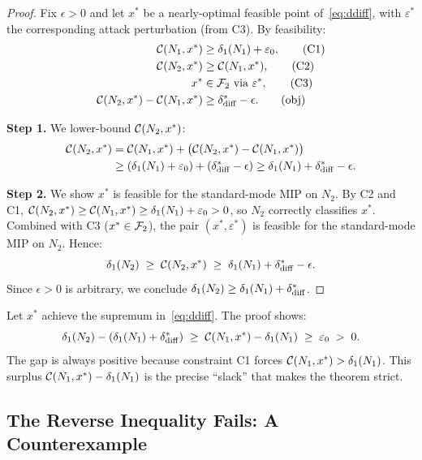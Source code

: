 \begin{proof}
  Fix $\epsilon>0$ and let $x^*$ be a nearly-optimal feasible point of~\eqref{eq:ddiff}, with $\varepsilon^*$ the corresponding attack perturbation (from C3). By feasibility:
  \begin{align}
    \mathcal{C}(N_1,x^*) &\geq \delta_1(N_{1})+\varepsilon_0, \tag{C1}\\
    \mathcal{C}(N_2,x^*) &\geq \mathcal{C}(N_1,x^*), \tag{C2}\\
    x^* &\in\mathcal{F}_{2} \text{ via } \varepsilon^*, \tag{C3}\\
    \mathcal{C}(N_2,x^*)-\mathcal{C}(N_1,x^*) &\geq \delta_{\mathrm{diff}}^{*}-\epsilon. \tag{obj}
  \end{align}

  \textbf{Step 1.} We lower-bound $\mathcal{C}(N_2,x^*)$:
  \begin{align*}
    \mathcal{C}(N_2,x^*)
    &= \mathcal{C}(N_1,x^*)+\bigl(\mathcal{C}(N_2,x^*)-\mathcal{C}(N_1,x^*)\bigr)\\
    &\geq (\delta_1(N_{1})+\varepsilon_0)+(\delta_{\mathrm{diff}}^{*}-\epsilon)
    \geq \delta_1(N_{1})+\delta_{\mathrm{diff}}^{*}-\epsilon.
  \end{align*}

  \textbf{Step 2.} We show $x^*$ is feasible for the standard-mode MIP on $N_2$. By C2 and C1, $\mathcal{C}(N_2,x^*)\geq\mathcal{C}(N_1,x^*)\geq\delta_1(N_{1})+\varepsilon_0>0$, so $N_2$ correctly classifies $x^*$. Combined with C3 ($x^*\in\mathcal{F}_{2}$), the pair $(x^*,\varepsilon^*)$ is feasible for the standard-mode MIP on $N_2$. Hence:
  \[
    \delta_1(N_{2}) \;\geq\;\mathcal{C}(N_2,x^*) \;\geq\;\delta_1(N_{1})+\delta_{\mathrm{diff}}^{*}-\epsilon.
  \]
  Since $\epsilon>0$ is arbitrary, we conclude $\delta_1(N_{2})\geq\delta_1(N_{1})+\delta_{\mathrm{diff}}^{*}$.
\end{proof}

\begin{remark}
  \label{rem:gap}
  Let $x^*$ achieve the supremum in~\eqref{eq:ddiff}. The proof shows:
  \[
    \delta_1(N_{2}) - (\delta_1(N_{1})+\delta_{\mathrm{diff}}^{*})
    \;\geq\;
    \mathcal{C}(N_1,x^*)-\delta_1(N_{1})
    \;\geq\;\varepsilon_0\;>\;0.
  \]
  The gap is always positive because constraint C1 forces $\mathcal{C}(N_1,x^*)>\delta_1(N_{1})$. This surplus $\mathcal{C}(N_1,x^*)-\delta_1(N_{1})$ is the precise ``slack'' that makes the theorem strict.
\end{remark}

\subsection{The Reverse Inequality Fails: A Counterexample}
\label{sec:formal:counter}

